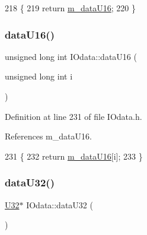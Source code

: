 \begin{DoxyCode}
218                 \{
219     \textcolor{keywordflow}{return} \hyperlink{classIOdata_a8d698e077b7898009691b9086a3e6453}{m\_dataU16};
220   \}
\end{DoxyCode}
\mbox{\label{classIOdata_a32e3bb958cb6babcb928d403fea9f171}} 
\subsubsection{\texorpdfstring{data\+U16()}{dataU16()}\hspace{0.1cm}{\footnotesize\ttfamily [2/2]}}
{\footnotesize\ttfamily unsigned long int I\+Odata\+::data\+U16 (\begin{DoxyParamCaption}\item[{unsigned long int}]{i }\end{DoxyParamCaption})\hspace{0.3cm}{\ttfamily [inline]}}



Definition at line 231 of file I\+Odata.\+h.



References m\+\_\+data\+U16.


\begin{DoxyCode}
231                                                 \{
232     \textcolor{keywordflow}{return} \hyperlink{classIOdata_a8d698e077b7898009691b9086a3e6453}{m\_dataU16}[i];
233   \}
\end{DoxyCode}
\mbox{\label{classIOdata_ab0e3cd09f46c1c3712f797116f6da074}} 
\subsubsection{\texorpdfstring{data\+U32()}{dataU32()}\hspace{0.1cm}{\footnotesize\ttfamily [1/2]}}
{\footnotesize\ttfamily \hyperlink{classIOdata_a96fb57f5fcd87b708743abd3c86a5198}{U32}$\ast$ I\+Odata\+::data\+U32 (\begin{DoxyParamCaption}{ }\end{DoxyParamCaption})\hspace{0.3cm}{\ttfamily [inline]}}



